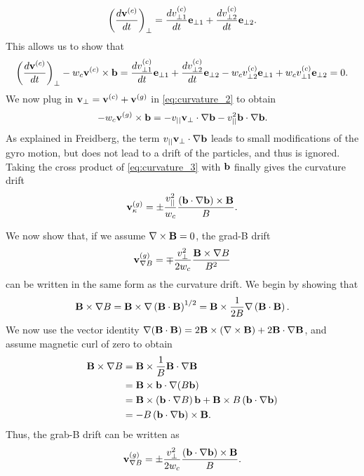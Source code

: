 \documentclass[a4paper,11pt]{report}
\begin{document}
\begin{equation}
    \left ( \frac{d \mathbf{v}^{(c)}}{dt} \right )_\perp = \frac{dv^{(c)}_{\perp1}}{dt} \mathbf{e}_{\perp1} + \frac{dv^{(c)}_{\perp2}}{dt} \mathbf{e}_{\perp2}.
\end{equation}
This allows us to show that 
\begin{equation}
    \left ( \frac{d \mathbf{v}^{(c)}}{dt} \right )_\perp - w_c \mathbf{v}^{(c)} \times \mathbf{b} = \frac{dv^{(c)}_{\perp1}}{dt} \mathbf{e}_{\perp1} + \frac{dv^{(c)}_{\perp2}}{dt} \mathbf{e}_{\perp2} - w_c v^{(c)}_{\perp2} \mathbf{e}_{\perp1} + w_c v^{(c)}_{\perp1} \mathbf{e}_{\perp2} = 0.
\end{equation}
We now plug in $\mathbf{v}_\perp = \mathbf{v}^{(c)} + \mathbf{v}^{(g)}$ in \cref{eq:curvature_2} to obtain
\begin{equation}
\label{eq:curvature_3}
    -w_c \mathbf{v}^{(g)} \times \mathbf{b} = - v_{||} \mathbf{v}_\perp \cdot \nabla \mathbf{b} - v_{||}^2 \mathbf{b} \cdot \nabla \mathbf{b}.
\end{equation}
As explained in Freidberg, the term $v_{||} \mathbf{v}_\perp \cdot \nabla \mathbf{b}$ leads to small modifications of the gyro motion, but does not lead to a drift of the particles, and thus is ignored. Taking the cross product of \cref{eq:curvature_3} with $\mathbf{b}$ finally gives the curvature drift
\begin{equation}
    \mathbf{v}^{(g)}_\kappa = \pm \frac{v_{||}^2}{w_c} \frac{( \mathbf{b} \cdot \nabla \mathbf{b} ) \times \mathbf{B}}{B}.
\end{equation}

We now show that, if we assume $\nabla \times \mathbf{B} = 0$, the grad-B drift 
\begin{equation}
    \mathbf{v}^{(g)}_{\nabla B} = \mp \frac{v^2_\perp}{2 w_c} \frac{\mathbf{B} \times \nabla B}{B^2}
\end{equation}
can be written in the same form as the curvature drift. We begin by showing that
\begin{equation}
    \mathbf{B} \times \nabla B = \mathbf{B} \times \nabla \left ( \mathbf{B} \cdot \mathbf{B} \right )^{1/2} = \mathbf{B} \times \frac{1}{2B} \nabla \left ( \mathbf{B} \cdot \mathbf{B} \right ).
\end{equation}
We now use the vector identity $\nabla (\mathbf{B} \cdot \mathbf{B} ) = 2 \mathbf{B} \times (\nabla \times \mathbf{B}) + 2 \mathbf{B} \cdot \nabla \mathbf{B}$, and assume magnetic curl of zero to obtain
\begin{align}
    \mathbf{B} \times \nabla B &= \mathbf{B} \times \frac{1}{B} \mathbf{B} \cdot \nabla \mathbf{B} \nonumber \\
    &= \mathbf{B} \times \mathbf{b} \cdot \nabla (B \mathbf{b}) \nonumber \\
    &= \mathbf{B} \times \left (\mathbf{b} \cdot \nabla B \right ) \mathbf{b} + \mathbf{B} \times B \left (\mathbf{b} \cdot \nabla \mathbf{b} \right ) \nonumber \\
    &= -B \left ( \mathbf{b} \cdot \nabla \mathbf{b} \right ) \times \mathbf{B}.
\end{align}
Thus, the grab-B drift can be written as 
\begin{equation}
    \mathbf{v}^{(g)}_{\nabla B} = \pm \frac{v^2_\perp}{2 w_c} \frac{(\mathbf{b} \cdot \nabla \mathbf{b}) \times \mathbf{B}}{B}.
\end{equation}
\end{document}
